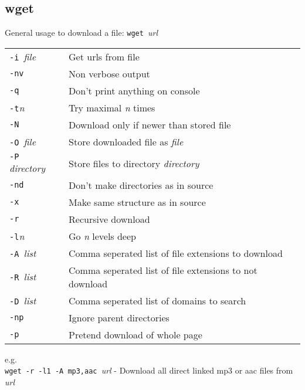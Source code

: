 \subsection{wget}
General usage to download a file: \verb!wget !\textit{url}
\begin{tabular}{@{}p{\the\MyLen}%
				@{}p{\linewidth-\the\MyLen}}
	\verb!-i !\textit{file}				& Get urls from file\\
	\verb!-nv!							& Non verbose output\\
	\verb!-q!							& Don't print anything on console\\
	\verb!-t!\textit{n}					& Try maximal \textit{n} times\\
	\verb!-N !							& Download only if newer than stored file\\
	\verb!-O !\textit{file}				& Store downloaded file as \textit{file}\\
	\verb!-P !\textit{directory}		& Store files to directory \textit{directory}\\
	\verb!-nd!							& Don't make directories as in source\\
	\verb!-x!							& Make same structure as in source\\
	\verb!-r!							& Recursive download\\
	\verb!-l!\textit{n}					& Go \textit{n} levels deep\\
	\verb!-A !\textit{list}				& Comma seperated list of file extensions to download\\
	\verb!-R !\textit{list}				& Comma seperated list of file extensions to not download\\
	\verb!-D !\textit{list}				& Comma seperated list of domains to search\\
	\verb!-np!							& Ignore parent directories\\
	\verb!-p!							& Pretend download of whole page\\
\end{tabular}

e.g.\\
\verb!wget -r -l1 -A mp3,aac !\textit{url} - Download all direct linked mp3 or aac files from \textit{url}\\ 

